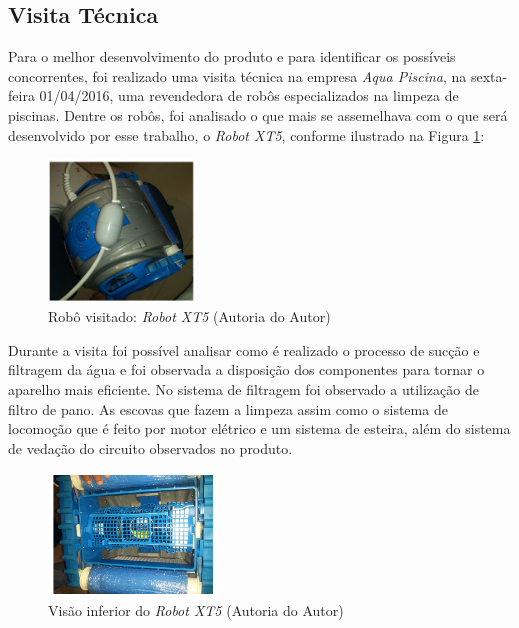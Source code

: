 \subsection{Visita Técnica}
Para o melhor desenvolvimento do produto e para identificar os possíveis 
concorrentes, foi realizado uma visita técnica na empresa \textit{Aqua Piscina}, na 
sexta-feira 01/04/2016, uma revendedora de robôs especializados na limpeza de
piscinas. Dentre os robôs, foi analisado o que mais se assemelhava com o que 
será desenvolvido por esse trabalho, o \textit{Robot XT5}, conforme ilustrado na 
Figura \ref{fig:robo_visited}:

\begin{figure}[!htp]
   \centering
    \includegraphics[width=0.35\textwidth]{figures/robo_visited.jpg}
    \caption{Robô visitado: \textit{Robot XT5} (\textsf{Autoria do Autor})}
    \label{fig:robo_visited}
\end{figure}

Durante a visita foi possível analisar como é realizado o processo de sucção e 
filtragem da água e foi observada a disposição dos componentes para tornar o 
aparelho mais eficiente. No sistema de filtragem foi observado a utilização de 
filtro de pano. As escovas que fazem a limpeza assim como o sistema de 
locomoção que é feito por motor elétrico e um sistema de esteira, além do 
sistema de vedação do circuito observados no produto.

\begin{figure}[!h]
   \centering
    \includegraphics[width=0.4\textwidth]{figures/bottom_view_robot.jpg}
    \caption{Visão inferior do \textit{Robot XT5} (\textsf{Autoria do Autor})}
    \label{fig:bottow_view_robot}
\end{figure}
\FloatBarrier

